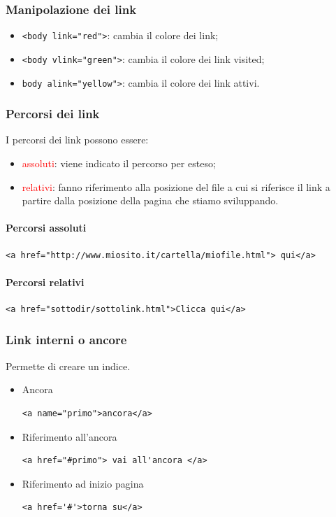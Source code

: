 \documentclass{article}
\begin{document}
\subsubsection{Manipolazione dei link}
\begin{itemize}
    \item \texttt{<body link="red">}: cambia il colore dei link;
    \item \texttt{<body vlink="green">}: cambia il colore dei link visited;
    \item \texttt{body alink="yellow">}: cambia il colore dei link attivi.
\end{itemize}
\subsubsection{Percorsi dei link}
I percorsi dei link possono essere:
\begin{itemize}
    \item \textcolor{red}{assoluti}: viene indicato il percorso per esteso;
    \item \textcolor{red}{relativi}: fanno riferimento alla posizione del file a cui si riferisce il link a partire dalla posizione della pagina che stiamo sviluppando.
\end{itemize}
\paragraph{Percorsi assoluti} \mbox{}
\begin{lstlisting}[style=htmlstyle]
<a href="http://www.miosito.it/cartella/miofile.html"> qui</a>
\end{lstlisting}
\paragraph{Percorsi relativi} \mbox{}
\begin{lstlisting}[style=htmlstyle]
<a href="sottodir/sottolink.html">Clicca qui</a>
\end{lstlisting}
\pagebreak
\subsubsection{Link interni o ancore}
Permette di creare un indice.
\begin{itemize}
    \item Ancora
          \begin{lstlisting}[style=htmlstyle]
    <a name="primo">ancora</a>
    \end{lstlisting}
    \item Riferimento all'ancora
          \begin{lstlisting}[style=htmlstyle]
    <a href="#primo"> vai all'ancora </a>
    \end{lstlisting}
    \item Riferimento ad inizio pagina
          \begin{lstlisting}[style=htmlstyle]
    <a href='#'>torna su</a>
    \end{lstlisting}
\end{itemize}
\end{document}
